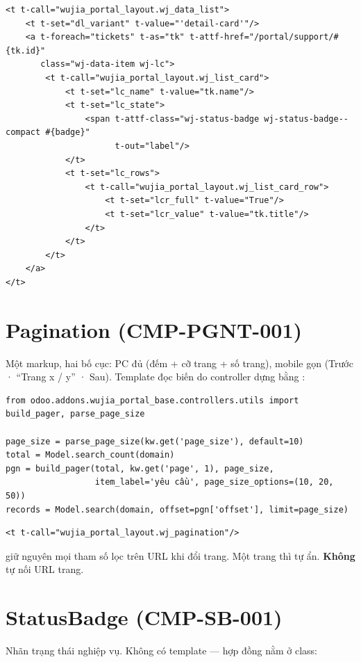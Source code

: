 \documentclass[11pt,a4paper]{report}
\newcommand{\no}{\textcolor{badred}{\textbf{Không}}}
\begin{document}
\begin{Verbatim}[frame=single,framesep=4pt,rulecolor=\color{black!20},fontsize=\small,xleftmargin=6pt]
<t t-call="wujia_portal_layout.wj_data_list">
    <t t-set="dl_variant" t-value="'detail-card'"/>
    <a t-foreach="tickets" t-as="tk" t-attf-href="/portal/support/#{tk.id}"
       class="wj-data-item wj-lc">
        <t t-call="wujia_portal_layout.wj_list_card">
            <t t-set="lc_name" t-value="tk.name"/>
            <t t-set="lc_state">
                <span t-attf-class="wj-status-badge wj-status-badge--compact #{badge}"
                      t-out="label"/>
            </t>
            <t t-set="lc_rows">
                <t t-call="wujia_portal_layout.wj_list_card_row">
                    <t t-set="lcr_full" t-value="True"/>
                    <t t-set="lcr_value" t-value="tk.title"/>
                </t>
            </t>
        </t>
    </a>
</t>
\end{Verbatim}

\section{Pagination (CMP-PGNT-001)}
Một markup, hai bố cục: PC đủ (đếm + cỡ trang + số trang), mobile gọn (Trước · ``Trang x / y'' · Sau).
Template đọc biến  do controller dựng bằng :

\begin{Verbatim}[frame=single,framesep=4pt,rulecolor=\color{black!20},fontsize=\small,xleftmargin=6pt]
from odoo.addons.wujia_portal_base.controllers.utils import build_pager, parse_page_size

page_size = parse_page_size(kw.get('page_size'), default=10)
total = Model.search_count(domain)
pgn = build_pager(total, kw.get('page', 1), page_size,
                  item_label='yêu cầu', page_size_options=(10, 20, 50))
records = Model.search(domain, offset=pgn['offset'], limit=page_size)
\end{Verbatim}

\begin{Verbatim}[frame=single,framesep=4pt,rulecolor=\color{black!20},fontsize=\small,xleftmargin=6pt]
<t t-call="wujia_portal_layout.wj_pagination"/>
\end{Verbatim}

 giữ nguyên mọi tham số lọc trên URL khi đổi trang. Một trang thì tự ẩn. \no{} tự nối URL trang.

\section{StatusBadge (CMP-SB-001)}
Nhãn trạng thái nghiệp vụ. Không có template --- hợp đồng nằm ở class:
\end{document}
